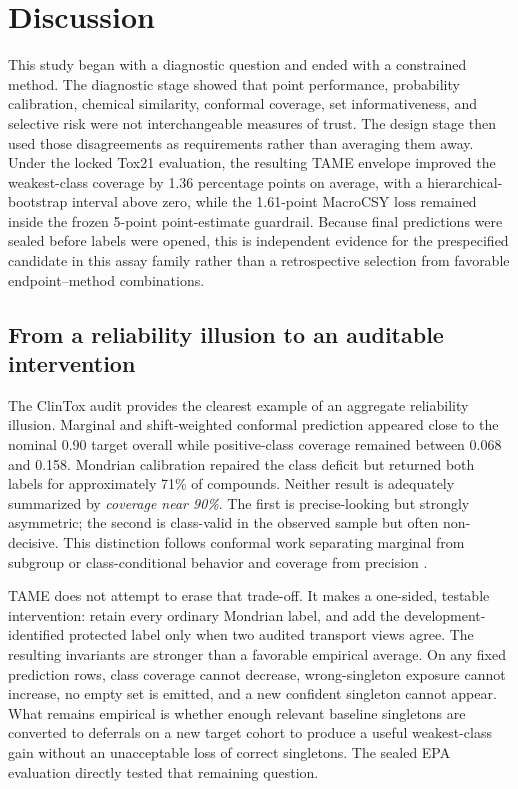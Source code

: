\section{Discussion}
\label{sec:discussion}

This study began with a diagnostic question and ended with a constrained method. The diagnostic stage showed that point performance, probability calibration, chemical similarity, conformal coverage, set informativeness, and selective risk were not interchangeable measures of trust. The design stage then used those disagreements as requirements rather than averaging them away. Under the locked Tox21 evaluation, the resulting TAME envelope improved the weakest-class coverage by 1.36 percentage points on average, with a hierarchical-bootstrap interval above zero, while the 1.61-point MacroCSY loss remained inside the frozen 5-point point-estimate guardrail. Because final predictions were sealed before labels were opened, this is independent evidence for the prespecified candidate in this assay family rather than a retrospective selection from favorable endpoint--method combinations.

\subsection{From a reliability illusion to an auditable intervention}

The ClinTox audit provides the clearest example of an aggregate reliability illusion. Marginal and shift-weighted conformal prediction appeared close to the nominal 0.90 target overall while positive-class coverage remained between 0.068 and 0.158. Mondrian calibration repaired the class deficit but returned both labels for approximately 71\% of compounds. Neither result is adequately summarized by \emph{coverage near 90\%}. The first is precise-looking but strongly asymmetric; the second is class-valid in the observed sample but often non-decisive. This distinction follows conformal work separating marginal from subgroup or class-conditional behavior and coverage from precision \citep{krstajic2021critical,cauchois2021knowing,bastani2022multivalid,ding2023classconditional,fisch2022trading}.

TAME does not attempt to erase that trade-off. It makes a one-sided, testable intervention: retain every ordinary Mondrian label, and add the development-identified protected label only when two audited transport views agree. The resulting invariants are stronger than a favorable empirical average. On any fixed prediction rows, class coverage cannot decrease, wrong-singleton exposure cannot increase, no empty set is emitted, and a new confident singleton cannot appear. What remains empirical is whether enough relevant baseline singletons are converted to deferrals on a new target cohort to produce a useful weakest-class gain without an unacceptable loss of correct singletons. The sealed EPA evaluation directly tested that remaining question.

